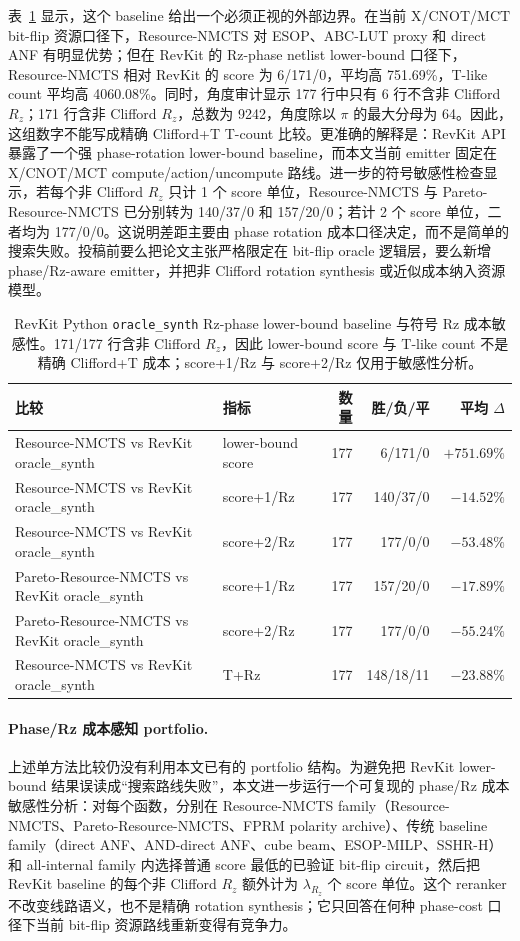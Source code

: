 \documentclass[UTF8,fontset=macnew,11pt]{ctexart}
\newcommand{\method}{Resource-NMCTS}
\newcommand{\mct}{\ensuremath{\mathrm{MCT}}}
\begin{document}
表~\ref{tab:revkit} 显示，这个 baseline 给出一个必须正视的外部边界。在当前 X/CNOT/\mct{} bit-flip 资源口径下，\method{} 对 ESOP、ABC-LUT proxy 和 direct ANF 有明显优势；但在 RevKit 的 Rz-phase netlist lower-bound 口径下，\method{} 相对 RevKit 的 score 为 6/171/0，平均高 751.69\%，T-like count 平均高 4060.08\%。同时，角度审计显示 177 行中只有 6 行不含非 Clifford $R_z$；171 行含非 Clifford $R_z$，总数为 9242，角度除以 $\pi$ 的最大分母为 64。因此，这组数字不能写成精确 Clifford+T T-count 比较。更准确的解释是：RevKit API 暴露了一个强 phase-rotation lower-bound baseline，而本文当前 emitter 固定在 X/CNOT/\mct{} compute/action/uncompute 路线。进一步的符号敏感性检查显示，若每个非 Clifford $R_z$ 只计 1 个 score 单位，\method{} 与 Pareto-\method{} 已分别转为 140/37/0 和 157/20/0；若计 2 个 score 单位，二者均为 177/0/0。这说明差距主要由 phase rotation 成本口径决定，而不是简单的搜索失败。投稿前要么把论文主张严格限定在 bit-flip oracle 逻辑层，要么新增 phase/Rz-aware emitter，并把非 Clifford rotation synthesis 或近似成本纳入资源模型。

\begin{table}[H]
\centering
\small
\caption{RevKit Python \texttt{oracle\_synth} Rz-phase lower-bound baseline 与符号 Rz 成本敏感性。171/177 行含非 Clifford $R_z$，因此 lower-bound score 与 T-like count 不是精确 Clifford+T 成本；score+1/Rz 与 score+2/Rz 仅用于敏感性分析。}
\label{tab:revkit}
\begin{tabularx}{\linewidth}{Xlrrr}
\toprule
比较 & 指标 & 数量 & 胜/负/平 & 平均 $\Delta$ \\
\midrule
\method{} vs RevKit oracle\_synth & lower-bound score & 177 & 6/171/0 & $+751.69\%$ \\
\method{} vs RevKit oracle\_synth & score+1/Rz & 177 & 140/37/0 & $-14.52\%$ \\
\method{} vs RevKit oracle\_synth & score+2/Rz & 177 & 177/0/0 & $-53.48\%$ \\
Pareto-\method{} vs RevKit oracle\_synth & score+1/Rz & 177 & 157/20/0 & $-17.89\%$ \\
Pareto-\method{} vs RevKit oracle\_synth & score+2/Rz & 177 & 177/0/0 & $-55.24\%$ \\
\method{} vs RevKit oracle\_synth & T+Rz & 177 & 148/18/11 & $-23.88\%$ \\
\bottomrule
\end{tabularx}
\end{table}

\paragraph{Phase/Rz 成本感知 portfolio.}
上述单方法比较仍没有利用本文已有的 portfolio 结构。为避免把 RevKit lower-bound 结果误读成“搜索路线失败”，本文进一步运行一个可复现的 phase/Rz 成本敏感性分析：对每个函数，分别在 Resource-NMCTS family（\method{}、Pareto-\method{}、FPRM polarity archive）、传统 baseline family（direct ANF、AND-direct ANF、cube beam、ESOP-MILP、SSHR-H）和 all-internal family 内选择普通 score 最低的已验证 bit-flip circuit，然后把 RevKit baseline 的每个非 Clifford $R_z$ 额外计为 $\lambda_{R_z}$ 个 score 单位。这个 reranker 不改变线路语义，也不是精确 rotation synthesis；它只回答在何种 phase-cost 口径下当前 bit-flip 资源路线重新变得有竞争力。
\end{document}
